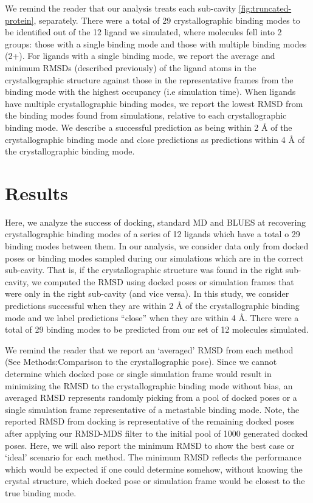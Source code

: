 We remind the reader that our analysis treats each sub-cavity \ref{fig:truncated-protein},  separately.
There were a total of 29 crystallographic binding modes to be identified out of the 12 ligand we simulated, where molecules fell into 2 groups: those with a single binding mode and those with multiple binding modes (2+).
For ligands with a single binding mode, we report the average and minimum RMSDs (described previously) of the ligand atoms in the crystallographic structure against those in the representative frames from the binding mode with the highest occupancy (i.e simulation time).
When ligands have multiple crystallographic binding modes, we report the lowest RMSD from the binding modes found from simulations, relative to each crystallographic binding mode.
We describe a successful prediction as being within 2 {\AA} of the crystallographic binding mode and close predictions as predictions within 4 {\AA} of the crystallographic binding mode.

\section{Results}
Here, we analyze the success of docking, standard MD and BLUES at recovering crystallographic binding modes of a series of 12 ligands which have a total o 29 binding modes between them.
In our analysis, we consider data only from docked poses or binding modes sampled during our simulations which are in the correct sub-cavity.
That is, if the crystallographic structure was found in the right sub-cavity, we computed the RMSD using docked poses or simulation frames that were only in the right sub-cavity (and vice versa).
In this study, we consider predictions successful when they are within 2 {\AA} of the crystallographic binding mode and we label predictions ``close'' when they are within 4 {\AA}.
There were a total of 29 binding modes to be predicted from our set of 12 molecules simulated.

We remind the reader that we report an `averaged' RMSD from each method (See Methods:Comparison to the crystallographic pose).
Since we cannot determine which docked pose or single simulation frame would result in minimizing the RMSD to the crystallographic binding mode without bias, an averaged RMSD represents randomly picking from a pool of docked poses or a single simulation frame representative of a metastable binding mode.
Note, the reported RMSD from docking is representative of the remaining docked poses after applying our RMSD-MDS filter to the initial pool of 1000 generated docked poses.
Here, we will also report the minimum RMSD to show the best case or `ideal' scenario for each method.
The minimum RMSD reflects the performance which would be expected if one could determine somehow, without knowing the crystal structure, which docked pose or simulation frame would be closest to the true binding mode.

